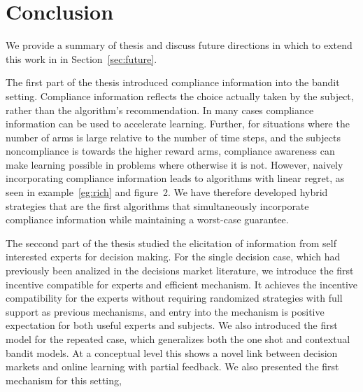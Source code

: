 \chapter{Conclusion}
\label{cha:conc}

We provide a summary of thesis and discuss future directions in which to extend this work in in Section~\ref{sec:future}.




The first part of the thesis introduced compliance information into the bandit setting. 
Compliance information reflects the choice actually taken by the subject, rather than the algorithm's recommendation. 
In many cases compliance information can be used to accelerate learning.
Further, for situations where the number of arms is large relative to the number of time steps, and the subjects noncompliance is towards the higher reward arms, compliance awareness can make learning possible in problems where otherwise it is not. 
However, naively incorporating compliance information leads to algorithms with linear regret, as seen in example~\ref{eg:rich} and figure~2. 
We have therefore developed hybrid strategies that are the first algorithms that simultaneously incorporate compliance information while maintaining a worst-case guarantee. 

The seccond part of the thesis studied the elicitation of information from self interested experts for decision making.
For the single decision case, which had previously been analized in the decisions market literature, we introduce the first incentive compatible for experts and efficient mechanism.
It achieves the incentive compatibility for the experts without requiring randomized strategies with full support as previous mechanisms, and entry into the mechanism is positive expectation for both useful experts and subjects.
We also introduced the first model for the repeated case, which generalizes both the one shot and contextual bandit models.
At a conceptual level this shows a novel link between decision markets and online learning with partial feedback.
We also presented the first mechanism for this setting, 




